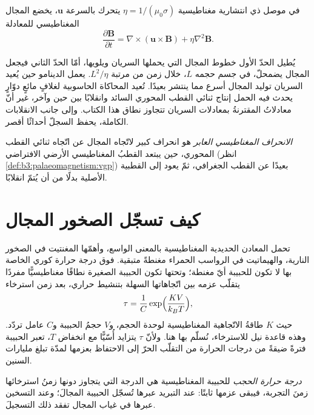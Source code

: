 \begin{proposition}\label{prop:b3:palaeomagnetism:induction}
في موصل ذي انتشارية مغناطيسية $\eta = 1/(\mu_0\sigma)$ يتحرك بالسرعة
$\mathbf u$، يخضع المجال المغناطيسي للمعادلة
\[
  \frac{\partial\mathbf B}{\partial t} = \nabla\times(\mathbf u\times\mathbf B)
  + \eta\nabla^2\mathbf B .
\]
\end{proposition}
\admitted

يُطيل الحدّ الأول خطوط المجال التي يحملها السريان ويلويها، أمّا
الحدّ الثاني فيجعل المجال يضمحلّ، في جسم حجمه $L$، خلال زمن من مرتبة
$L^2/\eta$. يعمل الدينامو حين يُعيد السريان توليد المجال أسرع مما ينتشر بعيدًا.
تُعيد المحاكاة الحاسوبية لغلافٍ مائعٍ دوّارٍ يحدث فيه الحمل إنتاج
ثنائي القطب المحوري السائد وانقلابًا بين حين وآخر، غير أنّ
معادلاتُ  المقترنةُ بمعادلات السريان تتجاوز
نطاق هذا الكتاب. وإلى جانب الانقلابات الكاملة، يحفظ السجلّ أحداثًا أقصر.

\begin{definition}\label{def:b3:palaeomagnetism:excursion}
\emph{الانحراف المغناطيسي العابر} هو انحراف كبير
لاتّجاه المجال عن اتّجاه ثنائي القطب المحوري، حين يبتعد
القطبُ المغناطيسي الأرضي الافتراضي (انظر \cref{def:b3:palaeomagnetism:vgp}) بعيدًا عن القطب الجغرافي،
ثمّ يعود إلى القطبية الأصلية بدلًا من
أن يُتمّ انقلابًا.
\end{definition}

\section{كيف تسجّل الصخور المجال}

تحمل المعادن الحديدية المغناطيسية بالمعنى الواسع، وأهمّها المغنتيت في الصخور النارية،
والهيماتيت في الرواسب الحمراء مغنطةً متبقية. فوق درجة حرارة كوري الخاصة بها لا تكون للحبيبة
أيّ مغنطة؛ وتحتها تكون الحبيبة الصغيرة نطاقًا مغناطيسيًّا مفردًا يتقلّب عزمه
بين اتّجاهاتها السهلة بتنشيط حراري، بعد
زمن استرخاء
\[
  \tau = \frac1C\exp\Bigl(\frac{K V}{k_B T}\Bigr),
\]
حيث $K$ طاقةُ الاتّجاهية المغناطيسية لوحدة الحجم، و$V$ حجمُ الحبيبة
و$C$ عامل تردّد. وهذه قاعدة نيل للاسترخاء، نُسلّم بها هنا. ولأنّ
$\tau$ يتزايد أُسّيًّا مع انخفاض $T$، تعبر الحبيبة فترةً ضيقةً من درجات الحرارة
من التقلّب الحرّ إلى الاحتفاظ بعزمها لمدّة تبلغ مليارات
السنين.

\begin{definition}\label{def:b3:palaeomagnetism:blocking}
\emph{درجة حرارة الحجب} للحبيبة المغناطيسية
هي الدرجة التي يتجاوز دونها زمنُ استرخائها زمنَ
التجربة، فيبقى عزمها ثابتًا: عند التبريد عبرها تُسجّل الحبيبة
المجالَ؛ وعند التسخين عبرها في غياب المجال تفقد ذلك
التسجيلَ.
\end{definition}

